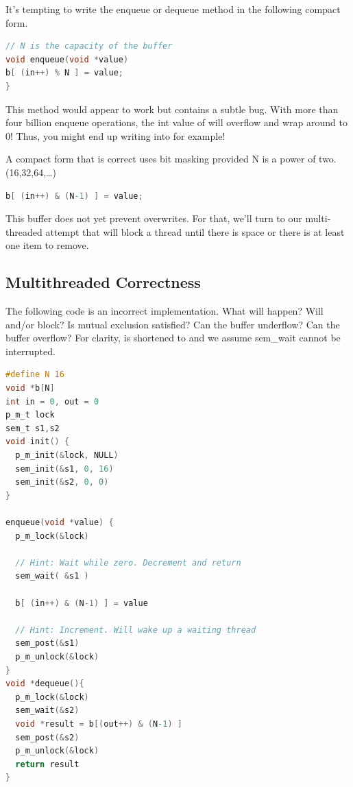 It's tempting to write the enqueue or dequeue method in the following compact form.

\begin{lstlisting}[language=C]
// N is the capacity of the buffer
void enqueue(void *value)
b[ (in++) % N ] = value;
}
\end{lstlisting}

This method would appear to work but contains a subtle bug.
With more than four billion enqueue operations, the int value of  will overflow and wrap around to 0!
Thus, you might end up writing into  for example!

A compact form that is correct uses bit masking provided N is a power of two. (16,32,64,\ldots{})

\begin{lstlisting}[language=C]
b[ (in++) & (N-1) ] = value;
\end{lstlisting}

This buffer does not yet prevent overwrites.
For that, we'll turn to our multi-threaded attempt that will block a thread until there is space or there is at least one item to remove.

\subsection{Multithreaded Correctness}

The following code is an incorrect implementation.
What will happen?
Will  and/or  block?
Is mutual exclusion satisfied?
Can the buffer underflow?
Can the buffer overflow?
For clarity,  is shortened to  and we assume sem\_wait cannot be interrupted.

\begin{lstlisting}[language=C]
#define N 16
void *b[N]
int in = 0, out = 0
p_m_t lock
sem_t s1,s2
void init() {
  p_m_init(&lock, NULL)
  sem_init(&s1, 0, 16)
  sem_init(&s2, 0, 0)
}

enqueue(void *value) {
  p_m_lock(&lock)

  // Hint: Wait while zero. Decrement and return
  sem_wait( &s1 )

  b[ (in++) & (N-1) ] = value

  // Hint: Increment. Will wake up a waiting thread
  sem_post(&s1)
  p_m_unlock(&lock)
}
void *dequeue(){
  p_m_lock(&lock)
  sem_wait(&s2)
  void *result = b[(out++) & (N-1) ]
  sem_post(&s2)
  p_m_unlock(&lock)
  return result
}
\end{lstlisting}

